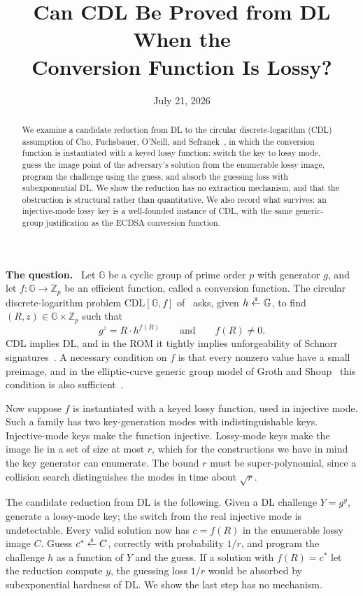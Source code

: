 \documentclass[11pt]{article}
\title{Can CDL Be Proved from DL When the\\ Conversion Function Is Lossy?}
\author{}
\date{July 21, 2026}
\newcommand{\GG}{\mathbb{G}}
\newcommand{\Zp}{\mathbb{Z}_p}
\newcommand{\getsr}{\mathrel{\stackrel{\raisebox{-1pt}{\tiny\$}}{\gets}}}
\newcommand{\heading}[1]{\medskip\noindent\textbf{#1}\ }
\begin{document}
\maketitle
\vspace{-3em}

\begin{abstract}
\noindent We examine a candidate reduction from DL to the circular discrete-logarithm (CDL) assumption of Cho, Fuchsbauer, O'Neill, and Sefranek~\cite{CFOS25}, in which the conversion function is instantiated with a keyed lossy function: switch the key to lossy mode, guess the image point of the adversary's solution from the enumerable lossy image, program the challenge using the guess, and absorb the guessing loss with subexponential DL. We show the reduction has no extraction mechanism, and that the obstruction is structural rather than quantitative. We also record what survives: an injective-mode lossy key is a well-founded instance of CDL, with the same generic-group justification as the ECDSA conversion function.
\end{abstract}

\heading{The question.}
Let $\GG$ be a cyclic group of prime order $p$ with generator $g$, and let $f \colon \GG \to \Zp$ be an efficient function, called a conversion function. The circular discrete-logarithm problem $\mathrm{CDL}[\GG,f]$ of~\cite{CFOS25} asks, given $h \getsr \GG$, to find $(R,z) \in \GG \times \Zp$ such that
$$g^z = R \cdot h^{f(R)} \qquad \text{and} \qquad f(R) \ne 0.$$
CDL implies DL, and in the ROM it tightly implies unforgeability of Schnorr signatures~\cite{CFOS25}. A necessary condition on $f$ is that every nonzero value have a small preimage, and in the elliptic-curve generic group model of Groth and Shoup~\cite{GS22} this condition is also sufficient~\cite{CFOS25}.

Now suppose $f$ is instantiated with a keyed lossy function, used in injective mode. Such a family has two key-generation modes with indistinguishable keys. Injective-mode keys make the function injective. Lossy-mode keys make the image lie in a set of size at most $r$, which for the constructions we have in mind the key generator can enumerate. The bound $r$ must be super-polynomial, since a collision search distinguishes the modes in time about $\sqrt{r}$.

The candidate reduction from DL is the following. Given a DL challenge $Y = g^y$, generate a lossy-mode key; the switch from the real injective mode is undetectable. Every valid solution now has $c = f(R)$ in the enumerable lossy image $C$. Guess $c^\ast \getsr C$, correctly with probability $1/r$, and program the challenge $h$ as a function of $Y$ and the guess. If a solution with $f(R) = c^\ast$ let the reduction compute $y$, the guessing loss $1/r$ would be absorbed by subexponential hardness of DL. We show the last step has no mechanism.
\end{document}
